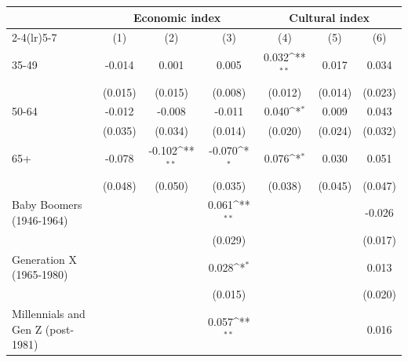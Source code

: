 {
\def\sym#1{\ifmmode^{#1}\else\(^{#1}\)\fi}
\begin{tabular}{l*{6}{c}}
\toprule
                    &\multicolumn{3}{c}{Economic index}                               &\multicolumn{3}{c}{Cultural index}                               \\\cmidrule(lr){2-4}\cmidrule(lr){5-7}
                    &\multicolumn{1}{c}{(1)}         &\multicolumn{1}{c}{(2)}         &\multicolumn{1}{c}{(3)}         &\multicolumn{1}{c}{(4)}         &\multicolumn{1}{c}{(5)}         &\multicolumn{1}{c}{(6)}         \\
\midrule
35-49               &      -0.014         &       0.001         &       0.005         &       0.032\sym{**} &       0.017         &       0.034         \\
                    &     (0.015)         &     (0.015)         &     (0.008)         &     (0.012)         &     (0.014)         &     (0.023)         \\
50-64               &      -0.012         &      -0.008         &      -0.011         &       0.040\sym{*}  &       0.009         &       0.043         \\
                    &     (0.035)         &     (0.034)         &     (0.014)         &     (0.020)         &     (0.024)         &     (0.032)         \\
65+                 &      -0.078         &      -0.102\sym{**} &      -0.070\sym{*}  &       0.076\sym{*}  &       0.030         &       0.051         \\
                    &     (0.048)         &     (0.050)         &     (0.035)         &     (0.038)         &     (0.045)         &     (0.047)         \\
Baby Boomers (1946-1964)&                     &                     &       0.061\sym{**} &                     &                     &      -0.026         \\
                    &                     &                     &     (0.029)         &                     &                     &     (0.017)         \\
Generation X (1965-1980)&                     &                     &       0.028\sym{*}  &                     &                     &       0.013         \\
                    &                     &                     &     (0.015)         &                     &                     &     (0.020)         \\
Millennials and Gen Z (post-1981)&                     &                     &       0.057\sym{**} &                     &                     &       0.016         \\

\end{tabular}}
